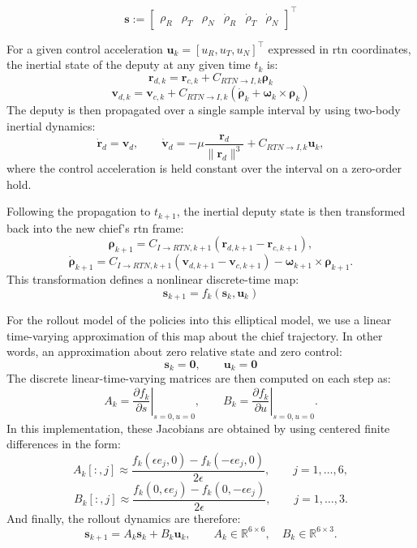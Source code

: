 \[
\mathbf{s} :=
\begin{bmatrix}
\rho_R &
\rho_T &
\rho_N &
\dot{\rho}_R &
\dot{\rho}_T &
\dot{\rho}_N
\end{bmatrix}^{\top}
\]

For a given control acceleration 
$\mathbf{u}_k = [u_R, u_T, u_N]^\top$ expressed in \acs{rtn} coordinates, the inertial state of the deputy at any given time $t_k$ is:
\[
\mathbf{r}_{d,k} = \mathbf{r}_{c,k} + C_{RTN \to I,k}\boldsymbol{\rho}_k
\]
\[
\mathbf{v}_{d,k} = \mathbf{v}_{c,k} + C_{RTN \to I,k}(\dot{\boldsymbol{\rho}}_k + \boldsymbol{\omega}_k \times \boldsymbol{\rho}_k)
\]
The deputy is then propagated over a single sample interval by using two-body inertial dynamics:
\[
\dot{\mathbf{r}}_d = \mathbf{v}_d,
\qquad
\dot{\mathbf{v}}_d = -\mu \frac{\mathbf{r}_d}{ \|\mathbf{r}_d\|^3} + C_{RTN \to I,k}\mathbf{u}_k,
\]
where the control acceleration is held constant over the interval on a zero-order hold.

Following the propagation to $t_{k+1}$, the inertial deputy state is then transformed back into the new chief's \acs{rtn} frame:
\[
\boldsymbol{\rho}_{k+1}
=
C_{I\to RTN,k+1}
\left(
\boldsymbol{r}_{d,k+1}-\boldsymbol{r}_{c,k+1}
\right),
\]
\[
\dot{\boldsymbol{\rho}}_{k+1}
=
C_{I\to RTN,k+1}
\left(
\boldsymbol{v}_{d,k+1}-\boldsymbol{v}_{c,k+1}
\right)
-
\boldsymbol{\omega}_{k+1}\times \boldsymbol{\rho}_{k+1}.
\]
This transformation defines a nonlinear discrete-time map:
\[
\mathbf{s}_{k+1} = f_k(\mathbf{s}_k, \mathbf{u}_k)
\]


For the rollout model of the policies into this elliptical model, we use a linear time-varying approximation of this map about the chief trajectory. In other words, an approximation about zero relative state and zero control:
\[
\mathbf{s}_k = \mathbf{0},
\qquad
\mathbf{u}_k = \mathbf{0}
\]
The discrete linear-time-varying matrices are then computed on each step as:
\[
A_k
=
\left.
\frac{\partial f_k}{\partial s}
\right|_{s=0,u=0},
\qquad
B_k
=
\left.
\frac{\partial f_k}{\partial u}
\right|_{s=0,u=0}.
\]
In this implementation, these Jacobians are obtained by using centered finite differences in the form:
\[
A_k[:,j]
\approx
\frac{
f_k(\epsilon e_j,0) - f_k(-\epsilon e_j,0)
}{2\epsilon},
\qquad
j=1,\ldots,6,
\]
\[
B_k[:,j]
\approx
\frac{
f_k(0,\epsilon e_j) - f_k(0,-\epsilon e_j)
}{2\epsilon},
\qquad
j=1,\ldots,3.
\]
And finally, the rollout dynamics are therefore:
\[
\mathbf{s}_{k+1} = A_k\mathbf{s}_k + B_k\mathbf{u}_k,
\qquad
A_k \in \mathbb{R}^{6\times 6},
\quad
B_k \in \mathbb{R}^{6\times 3}.
\]

